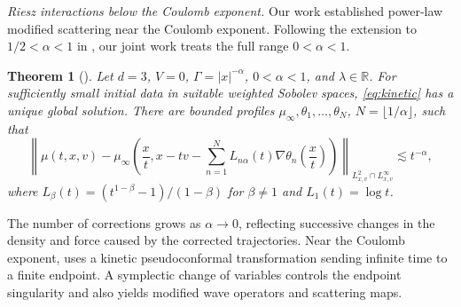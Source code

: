 \documentclass[10pt,reqno]{amsart}
\newtheorem{theorem}{Theorem}
\newcommand{\R}{\mathbb R}
\begin{document}
\smallskip
\noindent\emph{Riesz interactions below the Coulomb exponent.}
Our work \cite{HK24} established power-law modified scattering near the Coulomb exponent. Following the extension to $1/2<\alpha<1$ in \cite{HP26}, our joint work \cite{HX26b} treats the full range $0<\alpha<1$.
\begin{theorem}[\cite{HK24,HX26b}]\label{thm:riesz}
Let $d=3$, $V=0$, $\Gamma=|x|^{-\alpha}$, $0<\alpha<1$, and $\lambda\in\R$. For sufficiently small initial data in suitable weighted Sobolev spaces, \eqref{eq:kinetic} has a unique global solution. There are bounded profiles $\mu_\infty,\theta_1,\ldots,\theta_N$, $N=\lfloor1/\alpha\rfloor$, such that
\begin{equation}\label{eq:riesz-scattering}
\left\|\mu(t,x,v)-\mu_\infty\left(\frac{x}{t},
x-tv-\sum_{n=1}^{N}L_{n\alpha}(t)\nabla\theta_n\left(\frac{x}{t}\right)\right)\right\|_{L^2_{x,v}\cap L^\infty_{x,v}}
\lesssim t^{-\alpha},
\end{equation}
where $L_\beta(t)=(t^{1-\beta}-1)/(1-\beta)$ for $\beta\neq1$ and $L_1(t)=\log t$.
\end{theorem}
The number of corrections grows as $\alpha\to0$, reflecting successive changes in the density and force caused by the corrected trajectories. Near the Coulomb exponent, \cite{HK24} uses a kinetic pseudoconformal transformation sending infinite time to a finite endpoint. A symplectic change of variables controls the endpoint singularity and also yields modified wave operators and scattering maps.
\end{document}
